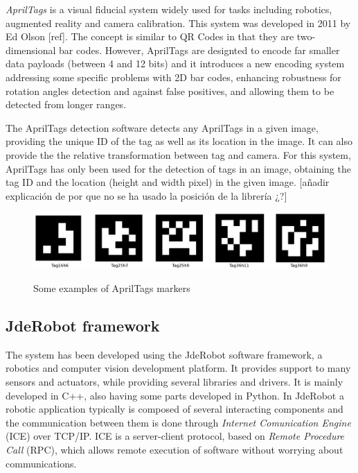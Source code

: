 \documentclass{styles/svproc}
\begin{document}
	\textit{AprilTags} is a visual fiducial system widely used for tasks including robotics, augmented reality and camera calibration. This system was developed in 2011 by Ed Olson [ref]. The concept is similar to QR Codes in that they are two-dimensional bar codes. However, AprilTags are designted to encode far smaller data payloads (between 4 and 12 bits) and it introduces a new encoding system addressing some specific problems with 2D bar codes, enhancing robustness for rotation angles detection and against false positives, and allowing them to be detected from longer ranges.
	
	The AprilTags detection software detects any AprilTags in a given image, providing the unique ID of the tag as well as its location in the image. It can also provide the the relative transformation between tag and camera. For this system, AprilTags has only been used for the detection of tags in an image, obtaining the tag ID and the location (height and width pixel) in the given image. [añadir explicación de por que no se ha usado la posición de la librería ¿?]
	
	\begin{figure}[h]
		\begin{center}
		{\includegraphics[width=\linewidth]{ejemplosapriltags.png}}
		\end{center}
		\caption{Some examples of AprilTags markers}
	\end{figure}
	
\subsection{JdeRobot framework}

	The system has been developed using the JdeRobot software framework, a robotics and computer vision development platform. It provides support to many sensors and actuators, while providing several libraries and drivers. It is mainly developed in C++, also having some parts developed in Python. In JdeRobot a robotic application typically is composed of several interacting components and the communication between them is done through \textit{Internet Comunication Engine} (ICE) over TCP/IP. ICE is a server-client protocol, based on \textit{Remote Procedure Call} (RPC), which allows remote execution of software without worrying about communications.
\end{document}
